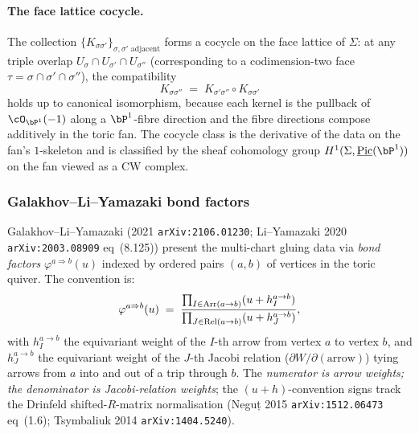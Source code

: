 \paragraph{The face lattice cocycle.}
The collection $\{K_{\sigma \sigma'}\}_{\sigma, \sigma' \text{ adjacent}}$
forms a cocycle on the face lattice of $\Sigma$: at any triple overlap
$U_\sigma \cap U_{\sigma'} \cap U_{\sigma''}$ (corresponding to a
codimension-two face $\tau = \sigma \cap \sigma' \cap \sigma''$), the
compatibility
\[
 K_{\sigma \sigma''} \;=\; K_{\sigma' \sigma''} \circ K_{\sigma \sigma'}
\]
holds up to canonical isomorphism, because each kernel is the pullback of
$\cO_{\bP^1}(-1)$ along a $\bP^1$-fibre direction and the fibre directions
compose additively in the toric fan. The cocycle class is the derivative
of the data on the fan's $1$-skeleton and is classified by the sheaf
cohomology group $H^1(\Sigma, \underline{\mathrm{Pic}}(\bP^1))$ on the fan
viewed as a CW complex.

\subsubsection{Galakhov--Li--Yamazaki bond factors}

Galakhov--Li--Yamazaki (2021 \texttt{arXiv:2106.01230}; Li--Yamazaki 2020
\texttt{arXiv:2003.08909} eq~(8.125)) present the multi-chart gluing data
via \emph{bond factors} $\varphi^{a \Rightarrow b}(u)$ indexed by ordered
pairs $(a, b)$ of vertices in the toric quiver. The convention is:
\begin{equation}\label{eq:gly-bond-factor}
 \varphi^{a \Rightarrow b}(u)
 \;=\;
 \frac{\prod_{I \in \mathrm{Arr}(a \to b)} (u + h^{a \to b}_I)}{%
 \prod_{J \in \mathrm{Rel}(a \to b)} (u + h^{a \to b}_J)},
\end{equation}
with $h^{a\to b}_I$ the equivariant weight of the $I$-th arrow from
vertex $a$ to vertex $b$, and $h^{a\to b}_J$ the equivariant weight of
the $J$-th Jacobi relation ($\partial W / \partial (\text{arrow})$) tying
arrows from $a$ into and out of a trip through $b$. The \emph{numerator
is arrow weights; the denominator is Jacobi-relation weights}; the
$(u + h)$-convention signs track the Drinfeld shifted-$R$-matrix
normalisation (Neguț 2015 \texttt{arXiv:1512.06473} eq~(1.6);
Tsymbaliuk 2014 \texttt{arXiv:1404.5240}).

